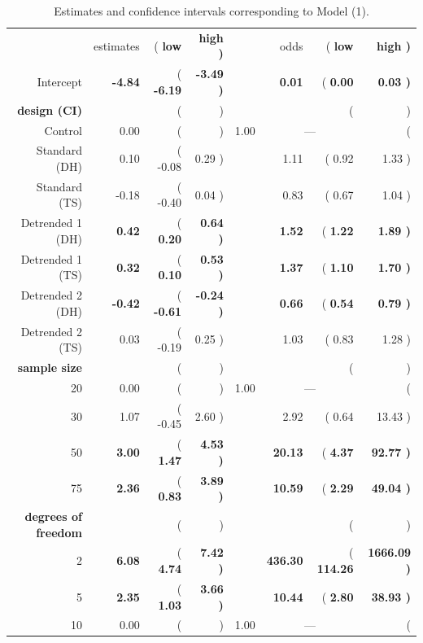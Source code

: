 \documentclass{article}\usepackage[]{graphicx}\usepackage[]{color}
\newcommand{\hh}[1]{{\color{magenta} #1}}
\begin{document}
% 
% 
\begin{table}[ht]
\caption{\label{tab:coefs} \hh{Estimates and confidence intervals corresponding to Model (1).}}
\centering
\begin{tabular}{rr>{ (}r@{, }r<{) }rr>{ (}r@{, }r<{) }}
\cline{2-4}\cline{6-8}
& estimates & \bf low & \bf high && odds &  \bf low & \bf high \\ 
 \cline{2-4} \cline{6-8}
  Intercept & \bf -4.84 & \bf -6.19 & \bf -3.49 && \bf 0.01 & \bf 0.00 & \bf 0.03 \\ [3pt]
\multicolumn{1}{r}{\bf design (CI)} \\  
Control & 0.00 & \multicolumn{2}{c}{---} && 1.00 & \multicolumn{2}{c}{---}\\
Standard (DH) & 0.10 & -0.08 & 0.29 && 1.11 & 0.92 & 1.33 \\ 
  Standard (TS) & -0.18 & -0.40 & 0.04 && 0.83 & 0.67 & 1.04 \\ [2pt]
%
Detrended 1 (DH) & \bf 0.42 & \bf 0.20 & \bf 0.64 && \bf  1.52 & \bf 1.22 & \bf 1.89 \\ 
  Detrended 1 (TS) & \bf 0.32 & \bf 0.10 & \bf 0.53 && \bf 1.37 & \bf 1.10 & \bf 1.70 \\ [2pt]
%
Detrended 2 (DH) & \bf -0.42 & \bf -0.61 & \bf  -0.24 && \bf 0.66 & \bf 0.54 & \bf  0.79 \\ 
  Detrended 2 (TS) & 0.03 & -0.19 & 0.25 && 1.03 & 0.83 & 1.28 \\ [3pt]
\multicolumn{1}{r}{\bf sample size} \\  
20 & 0.00 & \multicolumn{2}{c}{---} && 1.00 & \multicolumn{2}{c}{---}\\
  30 & 1.07 & -0.45 & 2.60 && 2.92 & 0.64 & 13.43 \\ 
  50 & \bf 3.00 & \bf 1.47 & \bf 4.53 && \bf 20.13 & \bf 4.37 & \bf 92.77 \\ 
  75 & \bf 2.36 & \bf 0.83 & \bf 3.89 && \bf 10.59 & \bf 2.29 & \bf 49.04 \\ [3pt]
\multicolumn{1}{r}{\bf degrees of freedom} \\  
 2 & \bf 6.08 & \bf 4.74 & \bf 7.42 && \bf 436.30 & \bf  114.26 & \bf 1666.09 \\ 
 5 & \bf 2.35 & \bf 1.03 & \bf  3.66 && \bf 10.44 & \bf 2.80 & \bf 38.93 \\ 
10 & 0.00 & \multicolumn{2}{c}{---} && 1.00 & \multicolumn{2}{c}{---}\\
\cline{2-4} \cline{6-8}
\end{tabular}
\end{table}
\afterpage{\clearpage}
\end{document}
